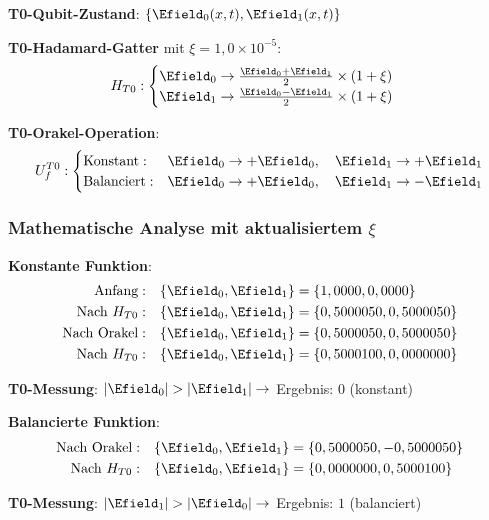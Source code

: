	\textbf{T0-Qubit-Zustand}: $\{\Efield_0(x,t), \Efield_1(x,t)\}$
	
	\textbf{T0-Hadamard-Gatter} mit $\xi = 1,0 \times 10^{-5}$:
	\begin{equation}
		H_{T0}: \begin{cases}
			\Efield_0 \rightarrow \frac{\Efield_0 + \Efield_1}{2} \times (1 + \xi) \\
			\Efield_1 \rightarrow \frac{\Efield_0 - \Efield_1}{2} \times (1 + \xi)
		\end{cases}
	\end{equation}
	
	\textbf{T0-Orakel-Operation}:
	\begin{equation}
		U_f^{T0}: \begin{cases}
			\text{Konstant}: & \Efield_0 \rightarrow +\Efield_0, \quad \Efield_1 \rightarrow +\Efield_1 \\
			\text{Balanciert}: & \Efield_0 \rightarrow +\Efield_0, \quad \Efield_1 \rightarrow -\Efield_1
		\end{cases}
	\end{equation}
	
	\subsubsection{Mathematische Analyse mit aktualisiertem $\xi$}
	
	\textbf{Konstante Funktion}:
	\begin{align}
		\text{Anfang}: \quad &\{\Efield_0, \Efield_1\} = \{1,0000, 0,0000\} \\
		\text{Nach } H_{T0}: \quad &\{\Efield_0, \Efield_1\} = \{0,5000050, 0,5000050\} \\
		\text{Nach Orakel}: \quad &\{\Efield_0, \Efield_1\} = \{0,5000050, 0,5000050\} \\
		\text{Nach } H_{T0}: \quad &\{\Efield_0, \Efield_1\} = \{0,5000100, 0,0000000\}
	\end{align}
	
	\textbf{T0-Messung}: $|\Efield_0| > |\Efield_1| \rightarrow$ Ergebnis: $0$ (konstant)
	
	\textbf{Balancierte Funktion}:
	\begin{align}
		\text{Nach Orakel}: \quad &\{\Efield_0, \Efield_1\} = \{0,5000050, -0,5000050\} \\
		\text{Nach } H_{T0}: \quad &\{\Efield_0, \Efield_1\} = \{0,0000000, 0,5000100\}
	\end{align}
	
	\textbf{T0-Messung}: $|\Efield_1| > |\Efield_0| \rightarrow$ Ergebnis: $1$ (balanciert)
	
